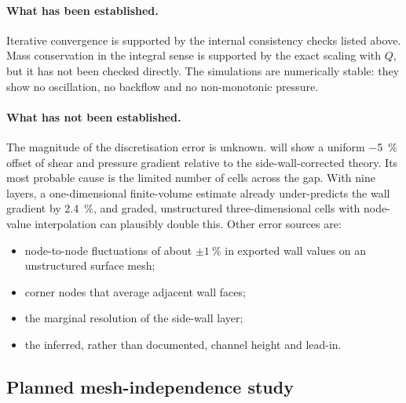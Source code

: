 \paragraph{What has been established.} Iterative convergence is supported by the internal consistency checks listed above. Mass conservation in the integral sense is supported by the exact scaling with $Q$, but it has not been checked directly. The simulations are numerically stable: they show no oscillation, no backflow and no non-monotonic pressure.

\paragraph{What has not been established.} The magnitude of the discretisation error is unknown.  will show a uniform \SI{-5}{\percent} offset of shear and pressure gradient relative to the side-wall-corrected theory. Its most probable cause is the limited number of cells across the gap. With nine layers, a one-dimensional finite-volume estimate already under-predicts the wall gradient by \SI{2.4}{\percent}, and graded, unstructured three-dimensional cells with node-value interpolation can plausibly double this. Other error sources are:
\begin{itemize}
\item node-to-node fluctuations of about $\pm\SI{1}{\percent}$ in exported wall values on an unstructured surface mesh;
\item corner nodes that average adjacent wall faces;
\item the marginal resolution of the side-wall layer;
\item the inferred, rather than documented, channel height and lead-in.
\end{itemize}

\subsection{Planned mesh-independence study}
\label{sec:num_gci}

